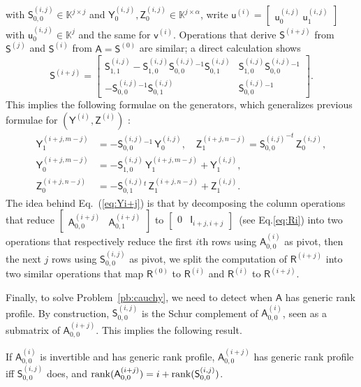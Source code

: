 \documentclass[sigconf]{acmart}
\newcommand{\vu}{\ensuremath{\mathsf{u}}}
\newcommand{\vv}{\ensuremath{\mathsf{v}}}
\newcommand{\mA}{\ensuremath{\mathsf{A}}}
\newcommand{\mI}{\ensuremath{\mathsf{I}}}
\newcommand{\mR}{\ensuremath{\mathsf{R}}}
\newcommand{\mS}{\ensuremath{\mathsf{S}}}
\newcommand{\mY}{\ensuremath{\mathsf{Y}}}
\newcommand{\mZ}{\ensuremath{\mathsf{Z}}}
\newcommand{\K}{\ensuremath{\mathbb{K}}}
\theoremstyle{acmdefinition}
\begin{document}
with $\mS^{(i,j)}_{0,0} \in \K^{j \times j}$ and
$\mY^{(i,j)}_0, \mZ^{(i,j)}_0 \in \K^{j \times \alpha}$, write
$\vu^{(i)} = 
[\begin{smallmatrix} \vu^{(i,j)}_0 \  \vu^{(i,j)}_1 
  \end{smallmatrix} ]$ 
with $\vu^{(i,j)}_0 \in \K^j$ and the same for $\vv^{(i)}$.
Operations that derive $\mS^{(i+j)}$ from
$\mS^{(j)}$ and $\mS^{(i)}$ from $\mA=\mS^{(0)}$ are similar; a direct calculation shows
\begin{equation}
\label{eq:Si+j}
\mS^{(i+j)} = 
\begin{bmatrix} 
  \mS^{(i,j)}_{1,1} - \mS^{(i,j)}_{1,0} {\mS^{(i,j)}_{0,0}}{}^{-1} \mS^{(i,j)}_{0,1} 
  & 
  \mS^{(i,j)}_{1,0} {\mS^{(i,j)}_{0,0}}{}^{-1} 
  \\[1mm]
  -{\mS^{(i,j)}_{0,0}}{}^{-1} \mS^{(i,j)}_{0,1}
  &  
  {\mS^{(i,j)}_{0,0}}{}^{-1} 
\end{bmatrix}.
\end{equation}
This implies the following formulae on the generators, which
generalizes previous formulae for $(\mY^{(i)},\mZ^{(i)})$ :
\begin{align}
\mY^{(i+j,m-j)}_1&= -{\mS^{(i,j)}_{0,0}}{}^{-1} \,\mY^{(i,j)}_0,\quad
\mZ^{(i+j,n-j)}_1= {\mS^{(i,j)}_{0,0}}^{-t} \,\mZ^{(i,j)}_0, \nonumber\\
\mY^{(i+j,m-j)}_0&=-\mS^{(i,j)}_{1,0} \,\mY^{(i+j,m-j)}_1 + \mY^{(i,j)}_1,\label{eq:Yi+j}\\
\mZ^{(i+j,n-j)}_0&=-{\mS^{(i,j)}_{0,1}}{}^t \,\mZ^{(i+j,n-j)}_1 + \mZ^{(i,j)}_1 \nonumber.
\end{align}
%
The idea behind Eq.~(\ref{eq:Yi+j}) is that by decomposing the column
operations that reduce
$[\begin{smallmatrix} \mA^{(i+j)}_{0,0} &
  \mA^{(i+j)}_{0,1} \end{smallmatrix}]$
to $[\begin{smallmatrix} 0 & \mI_{i+j,i+j} \end{smallmatrix}]$~(see
Eq.\eqref{eq:Ri}) into two operations that respectively reduce the
first $i$th rows using $\mA^{(i)}_{0,0}$ as pivot, then the next $j$
rows using $\mS^{(i,j)}_{0,0}$ as pivot, we split the computation of
$\mR^{(i+j)}$ into two similar operations that map $\mR^{(0)}$ to
$\mR^{(i)}$ and $\mR^{(i)}$ to $\mR^{(i+j)}$.

Finally, to solve Problem~\ref{pb:cauchy}, we need to detect when $\mA$ has
generic rank profile. By construction, $\mS^{(i,j)}_{0,0}$ is the
Schur complement of ${\mA^{(i)}_{0,0}}$, seen as a submatrix of
$\mA^{(i+j)}_{0,0}$. This implies the following result.
%
\begin{lemma}\label{lemma:update}
 If $\mA^{(i)}_{0,0}$ is invertible and has generic rank
  profile,
  $\mA^{(i+j)}_{0,0}$ has generic rank profile iff
  $\mS^{(i,j)}_{0,0}$ does, and
  ${\rm rank}(\mA^{(i+j)}_{0,0})=i+{\rm rank}(\mS^{(i,j)}_{0,0})$. 
\end{lemma}
%
\end{document}

